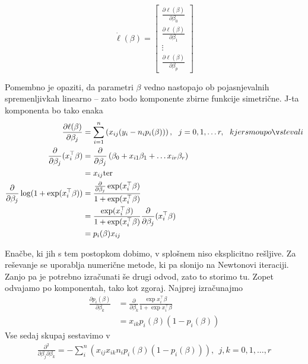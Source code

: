 \documentclass[12pt,a4paper]{amsart}
\theoremstyle{definition} %
\theoremstyle{plain} %
\begin{document}
\[
    \dot{\ell}(\beta) = \begin{bmatrix}
                                 \frac{\partial \ell(\beta)}{\partial \beta_{0}} \\
                                 \frac{\partial \ell(\beta)}{\partial \beta_{1}} \\
                                 \vdots \\
                                 \frac{\partial \ell(\beta)}{\partial \beta_{p}}
                        \end{bmatrix}
\]

Pomembno je opaziti, da parametri $\beta$ vedno nastopajo ob pojasnjevalnih spremenljivkah linearno -- zato bodo komponente zbirne funkcije simetrične.
J-ta komponenta bo tako enaka
\begin{align}
    \frac{\partial \ell(\beta)}{\partial \beta_{j}} &= \sum_{i=1}^{n} \left(x_{ij}(y_{i} - n_{i}p_{i}(\beta))   \right),~~j = 0,1,\ldots r, \text~~{kjer smo upoštevali} \\
    \frac{\partial}{\partial \beta_{j}}(x_{i}^\top\beta) &= \frac{\partial}{\partial \beta_{j}}\left(\beta_{0} + x_{i1}\beta_{1} + \ldots x_{ir}\beta_{r}\right) \nonumber\\
                                                    &= x_{ij} \text{ter} \\    
    \frac{\partial}{\partial \beta_{j}} \log(1 + \exp(x_{i}^\top\beta)) &= \frac{ \frac{\partial}{\partial \beta_{j}}\exp(x_{i}^\top\beta) }{1 + \exp(x_{i}^\top\beta)} \nonumber \\
    &= \frac{\exp(x_{i}^\top\beta)}{1 + \exp(x_{i}^\top\beta)} \frac{\partial}{\partial \beta_{j}} (x_{i}^\top\beta) \nonumber \\
    &=p_{i}(\beta)x_{ij}
\end{align}

Enačbe, ki jih s tem postopkom dobimo, v splošnem niso eksplicitno rešljive. Za reševanje se uporablja numerične metode, ki pa slonijo na Newtonovi iteraciji.
Zanjo pa je potrebno izračunati še drugi odvod, zato to storimo tu. Zopet odvajamo po komponentah, tako kot zgoraj. Najprej izračunajmo
\begin{align}
    \frac{\partial p_{i}(\beta)}{\partial \beta_{k}} &= \frac{\partial}{\partial \beta_{k}} \frac{\exp{x_{i}^\top\beta}}{1+\exp{x_{i}^\top\beta}} \nonumber \\
        &= x_{ik}p_{i}(\beta)(1 - p_{i}(\beta)) \nonumber
\end{align}
Vse sedaj skupaj sestavimo v
\begin{align}
    \frac{\partial^2}{\partial \beta_{j}\partial\beta_{k}} = - \sum_{i}^{n}\left(x_{ij}x_{ik}n_{i}p_{i}(\beta)(1-p_{i}(\beta))\right),~~j,k = 0,1,\ldots, r
\end{align}
\end{document}
